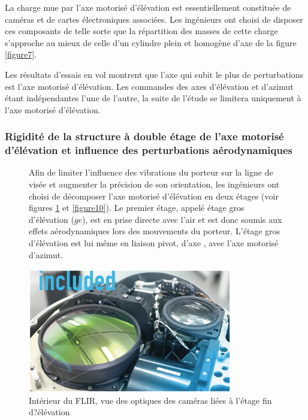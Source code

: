 La charge mue par l'axe motorisé d'élévation est essentiellement constituée de caméras et de cartes électroniques
associées. Les ingénieurs ont choisi de disposer ces composants de telle sorte que la répartition des masses de
cette charge s'approche au mieux de celle d'un cylindre plein et homogène d'axe  de la figure \ref{figure7}.


Les résultats d'essais en vol montrent que l'axe qui subit le plus de perturbations est l'axe motorisé d'élévation.
Les commandes des axes d'élévation et d'azimut étant indépendantes l'une de l'autre, la suite de l'étude se
limitera uniquement à l'axe motorisé d'élévation.

\subsubsection{Rigidité de la structure à double étage de l'axe motorisé d'élévation et influence des
perturbations aérodynamiques}

\begin{figure}[!htb]
\begin{center}
\begin{minipage}{0.45\textwidth}
Afin de limiter l'influence des vibrations du porteur sur la
ligne de visée et augmenter la précision de son orientation,
les ingénieurs ont choisi de décomposer l'axe motorisé
d'élévation en deux étages (voir figures \ref{fig9} et \ref{figure10}).
Le premier étage, appelé étage gros d'élévation ($ge$), est
en prise directe avec l'air et est donc soumis aux effets
aérodynamiques lors des mouvements du porteur. L'étage
gros d'élévation est lui même en liaison pivot, d'axe ,
avec l'axe motorisé d'azimut.
\end{minipage}
\begin{minipage}{0.45\textwidth}
\begin{center}
\includegraphics[width=0.8\textwidth]{images/figure9.jpg}
\caption{Intérieur du FLIR, vue des optiques des
caméras liées à l'étage fin d?élévation\label{fig9}}
\end{center}
\end{minipage}
\end{center}
\end{figure}

